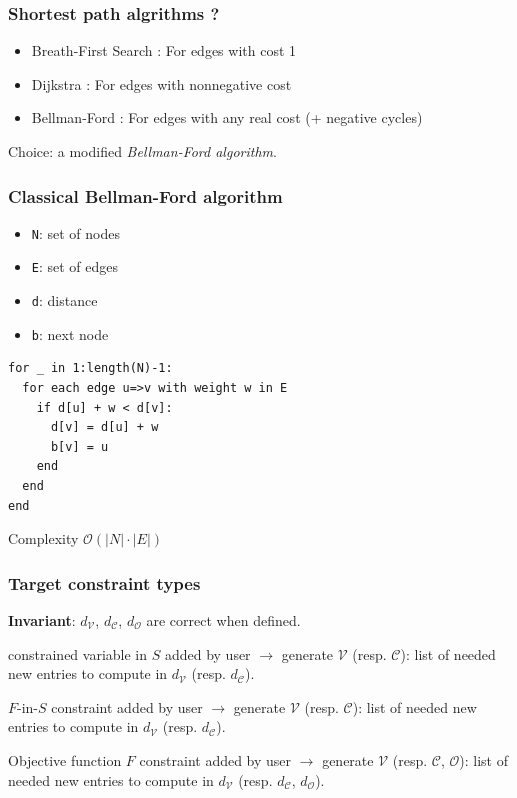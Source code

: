 \documentclass{beamer}
\begin{document}
\begin{frame}
  \frametitle{Shortest path algrithms ?}
  \begin{itemize}
    \item Breath-First Search : For edges with cost 1
    \item Dijkstra : For edges with nonnegative cost
    \item Bellman-Ford : For edges with any real cost (+ negative cycles)
  \end{itemize}

  Choice: a modified \emph{Bellman-Ford algorithm}.
\end{frame}

\begin{frame}[fragile]
  \frametitle{Classical Bellman-Ford algorithm}
  \begin{itemize}
    \item \texttt{N}: set of nodes
    \item \texttt{E}: set of edges
    \item \texttt{d}: distance
    \item \texttt{b}: next node
  \end{itemize}
\begin{verbatim}
for _ in 1:length(N)-1:
  for each edge u=>v with weight w in E
    if d[u] + w < d[v]:
      d[v] = d[u] + w
      b[v] = u
    end
  end
end
\end{verbatim}
Complexity $\mathcal{O}(|N| \cdot |E|)$
\end{frame}

\begin{frame}
  \frametitle{Target constraint types}
  \textbf{Invariant}: $d_\mathcal{V}$, $d_\mathcal{C}$, $d_\mathcal{O}$
  are correct when defined.

	\begin{block}{constrained variable in $S$ added by user}
		$\to$ generate  $\mathcal{V}$ (resp. $\mathcal{C}$): list of needed new entries
		to compute in $d_\mathcal{V}$ (resp. $d_\mathcal{C}$).
	\end{block}

	\begin{block}{$F$-in-$S$ constraint added by user}
		$\to$ generate  $\mathcal{V}$ (resp. $\mathcal{C}$): list of needed new entries
		to compute in $d_\mathcal{V}$ (resp. $d_\mathcal{C}$).
	\end{block}

	\begin{block}{Objective function $F$ constraint added by user}
		$\to$ generate  $\mathcal{V}$ (resp. $\mathcal{C}$, $\mathcal{O}$): list of needed new entries
		to compute in $d_\mathcal{V}$ (resp. $d_\mathcal{C}$, $d_\mathcal{O}$).
	\end{block}

\end{frame}
\end{document}
